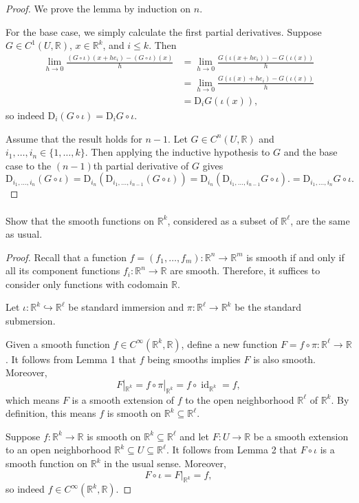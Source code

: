 \documentclass[12pt]{article}
\newlength{\myparskip}
\newenvironment{fullbox}{\begin{lrbox}{\savefullbox}\begin{minipage}{\dimexpr\textwidth-2\fboxsep\relax}\setlength{\parskip}{\myparskip}}{\end{minipage}\end{lrbox}\framebox[\textwidth]{\usebox{\savefullbox}}}
\newenvironment{pbox}[1][]{\begin{fullbox}\ifx#1\empty\else\paragraph{#1}\phantom{}\fi}{\end{fullbox}}
\theoremstyle{definition}
\newcommand{\R}{\mathbb{R}}
\newcommand{\<}{\langle}
\renewcommand{\>}{\rangle}
\newcommand{\seq}{\subseteq}
\DeclareMathOperator{\id}{id}
\newcommand{\inc}{\hookrightarrow}
\newcommand{\DD}{\mathrm{D}}
\begin{document}
\begin{proof}
    We prove the lemma by induction on $n$.

    For the base case, we simply calculate the first partial derivatives.
    Suppose $G \in C^1(U, \R)$, $x \in \R^k$, and $i \leq k$.
    Then
    \begin{align*}
        \lim_{h \to 0} \frac{(G \circ \iota)(x + he_i) - (G \circ \iota)(x)}{h}
            &= \lim_{h \to 0} \frac{G(\iota(x + he_i)) - G(\iota(x))}{h} \\
            &= \lim_{h \to 0} \frac{G(\iota(x) + he_i) - G(\iota(x))}{h} \\
            &= \DD_i G(\iota(x)),
    \end{align*}
    so indeed $\DD_i (G \circ \iota) = \DD_i G \circ \iota$.

    Assume that the result holds for $n-1$.
    Let $G \in C^n(U, \R)$ and $i_1, \dots, i_n \in \{1, \dots, k\}$.
    Then applying the inductive hypothesis to $G$ and the base case to the $(n-1)$th partial derivative of $G$ gives
    \[
        \DD_{i_1, \dots, i_n} (G \circ \iota)
            = \DD_{i_n}(\DD_{i_1, \dots, i_{n-1}} (G \circ \iota))
            = \DD_{i_n}(\DD_{i_1, \dots, i_{n-1}} G \circ \iota).
            = \DD_{i_1, \dots, i_n}G \circ \iota.
    \]
\end{proof}

\begin{pbox}[]
    Show that the smooth functions on $\R^k$, considered as a subset of $\R^\ell$, are the same as usual.
\end{pbox}

\begin{proof}
    Recall that a function $f = (f_1, \dots, f_m) : \R^n \to \R^m$ is smooth if and only if all its component functions $f_i : \R^n \to \R$ are smooth.
    Therefore, it suffices to consider only functions with codomain $\R$.

    Let $\iota : \R^k \inc \R^\ell$ be standard immersion and $\pi : \R^\ell \to \R^k$ be the standard submersion.

    Given a smooth function $f \in C^\infty(\R^k, \R)$, define a new function $F = f \circ \pi : \R^\ell \to \R$.
    It follows from Lemma 1 that $f$ being smooths implies $F$ is also smooth.
    Moreover,
    \[
        F|_{\R^k} = f \circ \pi|_{\R^k} = f \circ \id_{\R^k} = f,
    \]
    which means $F$ is a smooth extension of $f$ to the open neighborhood $\R^\ell$ of $\R^k$.
    By definition, this means $f$ is smooth on $\R^k \seq \R^\ell$.

    Suppose $f : \R^k \to \R$ is smooth on $\R^k \seq \R^\ell$ and let $F : U \to \R$ be a smooth extension to an open neighborhood $\R^k \seq U \seq \R^\ell$.
    It follows from Lemma 2 that $F \circ \iota$ is a smooth function on $\R^k$ in the usual sense.
    Moreover,
    \[
        F \circ \iota = F|_{\R^k} = f,
    \]
    so indeed $f \in C^\infty(\R^k, \R)$.
\end{proof}
\end{document}
